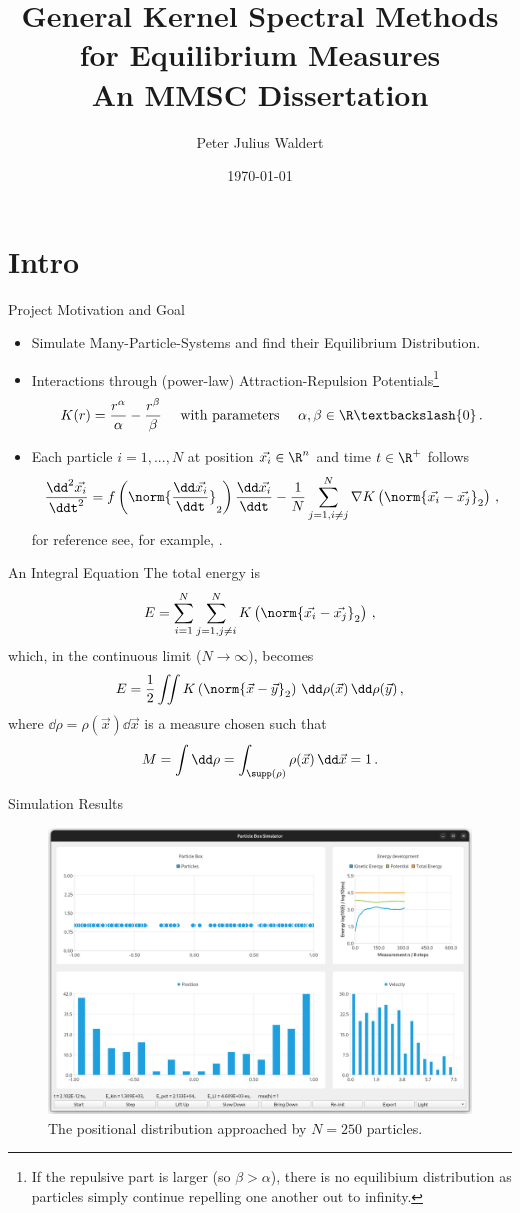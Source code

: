 \documentclass[aspectratio=169, hyperref={colorlinks=true}]{beamer}
\title{General Kernel Spectral Methods for Equilibrium Measures \\ \normalsize An MMSC Dissertation}
\author{Peter Julius Waldert}
\institute{Mathematical Institute \\ University of Oxford}
\date{\today}
\begin{document}
  {\frame{\titlepage}}

  \section{Intro}
   {
    \begin{frame}{Project Motivation and Goal}
      \vspace{0.4cm}
      \begin{itemize}
        \item Simulate Many-Particle-Systems and find their Equilibrium Distribution.
        \item Interactions through (power-law) Attraction-Repulsion Potentials\footnote{If the repulsive part is larger (so $\beta > \alpha$), there is no equilibium distribution as particles simply continue repelling one another out to infinity.}
              $$K(r) = \frac{r^\alpha}{\alpha} - \frac{r^\beta}{\beta}\quad \text{ with parameters } \quad \alpha, \beta \in \R \textbackslash \{0\}\,.$$
        \item Each particle $i=1, ..., N$ at position $\vec{x_i} \in \R^n$ and time $t \in \R^+$ follows
              $$\frac{\dd^2 \vec{x_i}}{\ddt^2} = f\left(\norm{\frac{\dd \vec{x_i}}{\ddt}}_2\right) \frac{\dd\vec{x_i}}{\ddt} - \frac{1}{N} \sum_{j=1, i\neq j}^{N} \nabla K\left(\norm{\vec{x_i} - \vec{x_j}}_2\right)\,,$$
              for reference see, for example, \parencite{2020-power-law-kernels, 2021-arbitrary-dimensions}.
      \end{itemize}
    \end{frame}
   }

  \begin{frame}{An Integral Equation}
    The total energy is $$E = \sum_{i=1}^{N} \sum_{j=1, j \neq i}^{N} K\left(\norm{\vec{x_i} - \vec{x_j}}_2\right)\,,$$
    which, in the continuous limit ($N \rightarrow \infty$), becomes
    $$E = \frac{1}{2} \iint K\left(\norm{\vec{x} - \vec{y}}_2\right) \,\dd\rho(\vec{x})\,\dd\rho(\vec{y})\,,$$ where $\dd\rho = \rho(\vec{x})\dd\vec{x}$ is a measure chosen such that $$M = \int \dd\rho = \int_{\supp(\rho)} \rho(\vec{x}) \,\dd\vec{x} = 1\,.$$
  \end{frame}

  \begin{frame}{Simulation Results}
    \begin{figure}
      \centering
      \includegraphics[width=0.64\linewidth]{figures/screenshot5.png}
      \caption{The positional distribution approached by $N = 250$ particles.}
    \end{figure}
  \end{frame}
\end{document}
